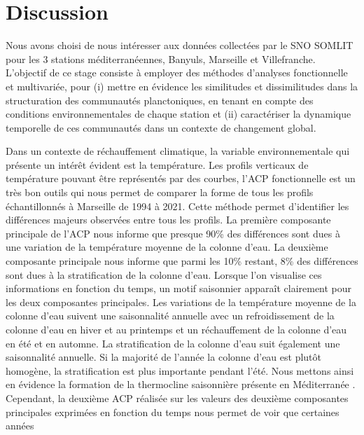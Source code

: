 \documentclass[12pt]{article}
\begin{document}
\section{Discussion}

Nous avons choisi de nous intéresser aux données collectées par le SNO SOMLIT pour les 3 stations méditerranéennes, Banyuls, Marseille et Villefranche. L’objectif de ce stage consiste à employer des méthodes d’analyses fonctionnelle et multivariée, pour (i) mettre en évidence les similitudes et dissimilitudes dans la structuration des communautés planctoniques, en tenant en compte des conditions environnementales de chaque station et (ii) caractériser la dynamique temporelle de ces communautés dans un contexte de changement global.   

Dans un contexte de réchauffement climatique, la variable environnementale qui présente un intérêt évident est la température. Les profils verticaux de température pouvant être représentés par des courbes, l’ACP fonctionnelle est un très bon outils qui nous permet de comparer la forme de tous les profils échantillonnés à Marseille de 1994 à 2021.  Cette méthode permet d’identifier les différences majeurs observées entre tous les profils. La première composante principale de l’ACP nous informe que presque 90\% des différences sont dues à une variation de la température moyenne de la colonne d’eau. %
La deuxième composante principale nous informe que parmi les 10\% restant, 8\% des différences sont dues à la stratification de la colonne d’eau. Lorsque l’on visualise ces informations en fonction du temps, un motif saisonnier apparaît clairement pour les deux composantes principales. Les variations de la température moyenne de la colonne d’eau suivent une saisonnalité annuelle avec un refroidissement de la colonne d’eau en hiver et au printemps et un réchauffement de la colonne d’eau en été et en automne. La stratification de la colonne d’eau suit également une saisonnalité annuelle. Si la majorité de l’année la colonne d’eau est plutôt homogène, la stratification est plus importante pendant l’été. Nous mettons ainsi en évidence la formation de la thermocline saisonnière présente en Méditerranée \citep{Millot1990}. Cependant, la deuxième ACP réalisée sur les valeurs des deuxième composantes principales exprimées en fonction du temps nous permet de voir que certaines années %
\end{document}
